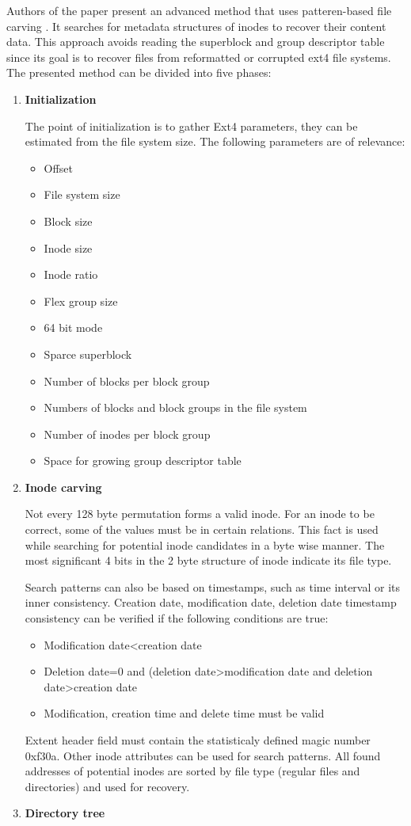 \documentclass{acm_proc_article-sp}
\begin{document}
Authors of the paper present an advanced method that uses patteren-based file carving . It searches for metadata structures of inodes to recover their content data. This approach avoids reading the superblock and group descriptor table since its goal is to recover files from reformatted or corrupted ext4 file systems. The presented method can be divided into five phases\cite{dewald2017afeic}:
\begin{enumerate}
\item \textbf{Initialization}

The point of initialization  is to gather Ext4 parameters, they can be estimated from the file system size. The following parameters are of relevance:
\begin{itemize} 
\item Offset
\item File system size
\item Block size
\item Inode size
\item Inode ratio
\item Flex group size
\item 64 bit mode
\item Sparce superblock
\item Number of blocks per block group
\item Numbers of blocks and block groups in the file system
\item Number of inodes per block group
\item Space for growing group descriptor table
\end{itemize}
\item \textbf{Inode carving}

Not every 128 byte permutation forms a valid inode. For an inode to be correct, some of the values must be in certain relations. This fact is used while searching for potential inode candidates in a byte wise manner. The most significant 4 bits in the 2 byte structure of inode indicate its file type.

Search patterns can also be based on timestamps, such as time interval or its inner consistency. Creation date, modification date, deletion date timestamp consistency can be verified if the following conditions are true:
\begin{itemize}
\item Modification date\textless creation date
\item Deletion date=0 and (deletion date\textgreater modification date and deletion date\textgreater creation date
\item Modification, creation time and delete time must be valid
\end{itemize}
Extent header field must contain the statisticaly defined magic number 0xf30a. Other inode attributes can be used for search patterns. All found addresses of potential inodes are sorted by file type (regular files and directories) and used for recovery.
\item \textbf{Directory tree}


\end{enumerate}
\end{document}
